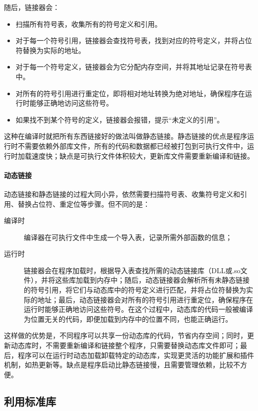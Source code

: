 随后，链接器会：
\begin{itemize}
    \item 扫描所有符号表，收集所有的符号定义和引用。
    \item 对于每一个符号引用，链接器会查找符号表，找到对应的符号定义，并将占位符替换为实际的地址。
    \item 对于每一个符号定义，链接器会为它分配内存空间，并将其地址记录在符号表中。
    \item 对所有的符号引用进行重定位，即将相对地址转换为绝对地址，确保程序在运行时能够正确地访问这些符号。
    \item 如果找不到某个符号的定义，链接器会报错，提示“未定义的引用”。
\end{itemize}
这种在编译时就把所有东西链接好的做法叫做静态链接。静态链接的优点是程序运行时不需要依赖外部库文件，所有的代码和数据都已经被打包到可执行文件中，运行时加载速度快；缺点是可执行文件体积较大，更新库文件需要重新编译和链接。

\paragraph{动态链接}

动态链接和静态链接的过程大同小异，依然需要扫描符号表、收集符号定义和引用、替换占位符、重定位等步骤。但不同的是：
\begin{description}
    \item[编译时] 编译器在可执行文件中生成一个导入表，记录所需外部函数的信息；
    \item[运行时] 链接器会在程序加载时，根据导入表查找所需的动态链接库（DLL或.so文件），并将这些库加载到内存中；随后，动态链接器会解析所有未静态链接的符号引用，将它们与动态库中的符号定义进行匹配，并将占位符替换为实际的地址；最后，动态链接器会对所有的符号引用进行重定位，确保程序在运行时能够正确地访问这些符号。在这个过程中，动态库的代码一般被编译为位置无关的代码，即便加载到内存中的位置不同，也能正确运行。 
\end{description}
这样做的优势是，不同程序可以共享一份动态库的代码，节省内存空间；同时，更新动态库时，不需要重新编译和链接整个程序，只需要替换动态库文件即可；最后，程序可以在运行时动态加载卸载特定的动态库，实现更灵活的功能扩展和插件机制，如热更新等。缺点是程序启动比静态链接慢，且需要管理依赖，比较不方便。

\subsection{利用标准库}

